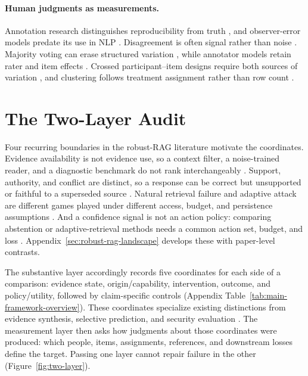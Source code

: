 \documentclass[11pt]{article}
\begin{document}
\paragraph{Human judgments as measurements.}
Annotation research distinguishes reproducibility from truth
\citep{artstein2008intercoder}, and observer-error models predate its use in
NLP \citep{dawid1979observer}. Disagreement is often signal rather than noise
\citep{uma2021disagreement}. Majority voting can erase structured variation
\citep{plank2022labelvariation,davani2022disagreements}, while annotator
models retain rater and item effects \citep{passonneau2014annotation,
paun2018bayesian}. Crossed participant--item designs require both sources of
variation \citep{baayen2008crossed}, and clustering follows treatment
assignment rather than row count \citep{abadie2023clustering}.

\section{The Two-Layer Audit}
\label{sec:estimands}

Four recurring boundaries in the robust-RAG literature motivate the
coordinates. Evidence availability is not evidence use, so a context filter, a
noise-trained reader, and a diagnostic benchmark do not rank interchangeably
\citep{irrelevantContext2023,raat2024,rgb2023,chainOfNote2023}. Support,
authority, and conflict are distinct, so a response can be correct but
unsupported or faithful to a superseded source
\citep{ragTruth2024,astuteRAG2025,freshllms2024}. Natural retrieval failure and
adaptive attack are different games played under different access, budget, and
persistence assumptions \citep{poisonedRAG2024,phantom2024,certifiedRAG2024}.
And a confidence signal is not an action policy: comparing abstention or
adaptive-retrieval methods needs a common action set, budget, and loss
\citep{guo2017calibration,geifman2017selective,selfRAG2023,crag2024,
sufficientContext2024}. Appendix~\ref{sec:robust-rag-landscape} develops these with
paper-level contrasts.

The substantive layer accordingly records five coordinates for each side of a
comparison: evidence state, origin/capability, intervention, outcome, and
policy/utility, followed by claim-specific controls
(Appendix Table~\ref{tab:main-framework-overview}). These coordinates specialize
existing distinctions from evidence synthesis, selective prediction, and
security evaluation \citep{richardson1995pico,chow1970reject,papernot2018sok}.
The measurement layer then asks how judgments about those coordinates were
produced: which people, items, assignments, references, and downstream losses
define the target. Passing one layer cannot repair failure in the other
(Figure~\ref{fig:two-layer}).
\end{document}
